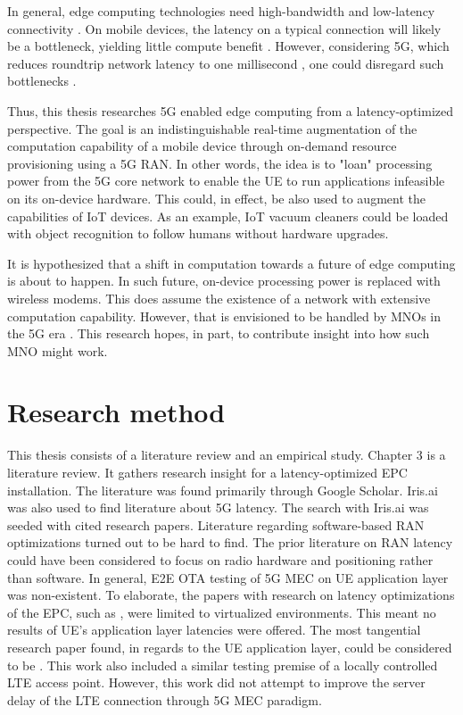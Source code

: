 \documentclass[12pt]{article}
\begin{document}
In general, edge computing technologies need high-bandwidth and low-latency connectivity \cite{kamarainen2017measurement}. On mobile devices, the latency on a typical connection will likely be a bottleneck, yielding little compute benefit \cite{simsek20165g}. However, considering \gls{5G}, which reduces roundtrip network latency to one millisecond \cite{parvez2018survey}, one could disregard such bottlenecks \cite{deber2015much}.

Thus, this thesis researches \gls{5G} enabled edge computing from a latency-optimized perspective. The goal is an indistinguishable real-time augmentation of the computation capability of a mobile device through on-demand resource provisioning using a \gls{5G} \gls{RAN}. In other words, the idea is to "loan" processing power from the \gls{5G} core network to enable the \gls{UE} to run applications infeasible on its on-device hardware. This could, in effect, be also used to augment the capabilities of \gls{IoT} devices. As an example, \gls{IoT} vacuum cleaners could be loaded with object recognition to follow humans without hardware upgrades.

It is hypothesized that a shift in computation towards a future of edge computing is about to happen. In such future, on-device processing power is replaced with wireless modems. This does assume the existence of a network with extensive computation capability. However, that is envisioned to be handled by \glspl{MNO} in the \gls{5G} era \cite{tran2017collaborative}. This research hopes, in part, to contribute insight into how such \gls{MNO} might work.
\newpage

\section{Research method}

This thesis consists of a literature review and an empirical study. Chapter 3 is a literature review. It gathers research insight for a latency-optimized \gls{EPC} installation. The literature was found primarily through Google Scholar. Iris.ai was also used to find literature about \gls{5G} latency. The search with Iris.ai was seeded with cited research papers. Literature regarding software-based \gls{RAN} optimizations turned out to be hard to find. The prior literature on \gls{RAN} latency could have been considered to focus on radio hardware and positioning rather than software. In general, \gls{E2E} \gls{OTA} testing of \gls{5G} \gls{MEC} on \gls{UE} application layer was non-existent. To elaborate, the papers with research on latency optimizations of the \gls{EPC}, such as \cite{mao2015minimizing}, were limited to virtualized environments. This meant no results of \gls{UE}'s application layer latencies were offered. The most tangential research paper found, in regards to the \gls{UE} application layer, could be considered to be \cite{kamarainen2017measurement}. This work also included a similar testing premise of a locally controlled \gls{LTE} access point. However, this work did not attempt to improve the server delay of the \gls{LTE} connection through \gls{5G} \gls{MEC} paradigm.
\end{document}
